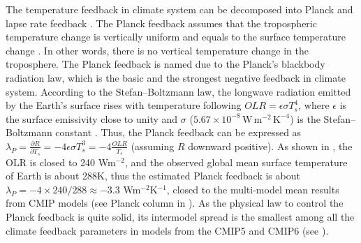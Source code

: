 The temperature feedback in climate system can be decomposed into Planck and lapse rate feedback \citep{Soden2006}. The Planck feedback    assumes that the tropospheric temperature change is vertically uniform and equals to the surface temperature change \citep{Bony2006,Soden2006}. In other words, there is no vertical temperature change in the troposphere. The Planck feedback is named due to the Planck's blackbody radiation law, which is the basic and the strongest negative feedback in climate system. According to the Stefan--Boltzmann law, the longwave radiation emitted by the Earth’s surface rises with temperature following $OLR=\epsilon\sigma T_s^4$, where $\epsilon$ is the surface emissivity close to unity and $\sigma$ ($5.67\times 10^{-8}\, \mathrm{W\, m^{-2}\,K^{-4}}$) is the Stefan--Boltzmann constant \citep{Pithan2014}. Thus, the Planck feedback can be expressed as $\lambda_P = \frac{\partial R}{\partial T_s}=-4\epsilon\sigma T_s^3=-4\frac{OLR}{T_s}$ (assuming $R$ downward positive). As shown in , the OLR is closed to 240 Wm$^{-2}$, and the observed global mean surface temperature of Earth is about 288K, thus the estimated Planck feedback is about $\lambda_P=-4\times 240/288\approx -3.3$ Wm$^{-2}$K$^{-1}$, closed to the multi-model mean results from CMIP models (see Planck column in ). As the physical law to control the Planck feedback is quite solid, its intermodel spread is the smallest among all the climate feedback parameters in models from the CMIP5 and CMIP6 (see ).


